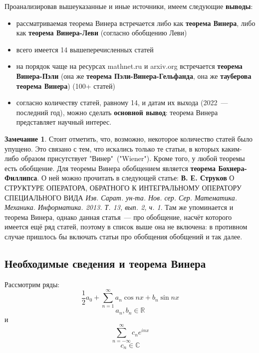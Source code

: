 \documentclass[12pt]{extarticle}
\theoremstyle{definition}
\newtheorem*{remark}{\indent Замечание}
\begin{document}
  	Проанализировав вышеуказанные и иные источники, имеем следующие \textbf{выводы}:
 	\begin{itemize}
		\item рассматриваемая теорема Винера встречается либо как \textbf{теорема Винера}, либо как \textbf{теорема Винера-Леви} (согласно обобщению Леви)
		\item всего имеется 14 вышеперечисленных статей
		\item на порядок чаще на ресурсах mathnet.ru и arxiv.org встречается \textbf{теорема Винера-Пэли} (она же \textbf{теорема Пэли-Винера-Гельфанда}, она же \textbf{тауберова теорема Винера}) (100+ статей)
		\item согласно количеству статей, равному 14, и датам их выхода (2022~--- последний год), можно сделать \textbf{основной вывод}: теорема Винера представляет научный интерес.
	\end{itemize}
  	\begin{remark}
          Стоит отметить, что, возможно, некоторое количество статей было упущено. Это связано с тем, что искались только те статьи, в которых каким-либо образом присутствует "Винер"\ ("Wiener"). Кроме того, у любой теоремы есть обобщение. Для теоремы Винера обобщением является \textbf{теорема Бохнера-Филлипса}. О ней можно прочитать в следующей статье: \textbf{В. Е. Струков} О СТРУКТУРЕ ОПЕРАТОРА, ОБРАТНОГО К ИНТЕГРАЛЬНОМУ ОПЕРАТОРУ СПЕЦИАЛЬНОГО ВИДА \textit{Изв. Сарат. ун-та. Нов. сер. Сер. Математика. Механика. Информатика. 2013. Т. 13, вып. 2, ч. 1}. Там же упоминается и теорема Винера, однако данная статья~--- про обобщение, насчёт которого имеется ещё ряд статей, поэтому в список выше она не включена: в противном случае пришлось бы включать статьи про обобщения обобщений и так далее.
      \end{remark}
  	\subsection{Необходимые сведения и теорема Винера}
  		Рассмотрим ряды:
  		$$\frac{1}{2}a_0+\sum_{n=1}^{\infty} a_n \cos nx+b_n \sin nx$$ $$a_n,b_n\in\mathbb{R}$$
  		и
  		$$\sum_{n=-\infty}^\infty c_n e^{inx}$$
  		$$c_n\in\mathbb{C}$$
\end{document}
